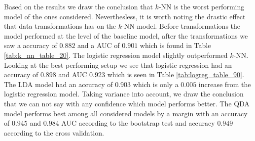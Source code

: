 \documentclass[../../project.tex]{subfiles}
\begin{document}
	Based on the results we draw the conclusion that $k$-NN is the worst performing model of the ones considered. Neverthesless, it is worth noting the drastic effect that data transformations has on the $k$-NN model. Before transformations the model performed at the level of the baseline model, after the transformations we saw a accuracy of $0.882$ and a AUC of $0.901$ which is found in Table \ref{tab:k_nn_table_20}. The logistic regression model slightly outperformed $k$-NN. Looking at the best performing setup we see that logistic regression had an accuracy of $0.898$ and AUC $0.923$ which is seen in Table \ref{tab:logreg_table_90}. The LDA model had an accuracy of $0.903$ which is only a $0.005$ increase from the logistic regression model. Taking variance into account, we draw the conclusion that we can not say with any confidence which model performs better. The QDA model performs best among all considered models by a margin with an accuracy of $0.945$ and $0.984$ AUC according to the bootstrap test and accuracy $0.949$ according to the cross validation.
	
	
	
	
\end{document}
